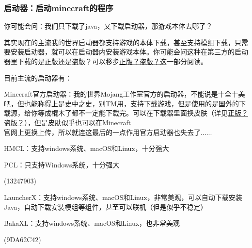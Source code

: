 \documentclass[UTF8,a4paper]{article}
\begin{document}
			\subsubsection{启动器：启动minecraft的程序}
				\hypertarget{qidongqi}{}
				\par 你可能会问：我们只下载了java，又下载启动器，那游戏本体去哪了？
				\par 其实现在的主流我的世界启动器都支持游戏的本体下载，甚至支持模组下载，只需要安装启动器，就可以在启动器内安装游戏本体。你可能会问这种在第三方的启动器里下载的是正版还是盗版？可以移步\hyperlink{zhengbandaoban}{正版？盗版？}这一部分阅读。
				\par 目前主流的启动器有：
				\par Minecraft官方启动器：我的世界Mojang工作室官方的启动器，不能说是十全十美吧，但也能称得上是史中之史，别TM用，支持下载游戏，但是使用的是国外的下载源，给你等成棍木了都不一定能下载完。可以在下载器里面换皮肤（详见\hyperlink{zhengbandaoban}{正版？盗版？}），但是皮肤似乎也可以在Minecraft \\ 官网上更换上传，所以就连这最后的一点作用官方启动器也失去了......
				\par HMCL：支持windows系统、macOS和Linux，十分强大
				\par PCL：只支持Windows系统，十分强大
				\begin{flushright}(13247903)\end{flushright}
				\par LauncherX：支持windows系统、macOS和Linux，非常美观，可以自动下载安装Java，自动下载安装模组等组件，甚至可以联机（但是似乎不稳定）
				\par BakaXL：支持windows系统、macOS和Linux，也非常美观
				\begin{flushright}(9DA62C42)\end{flushright}
\end{document}
